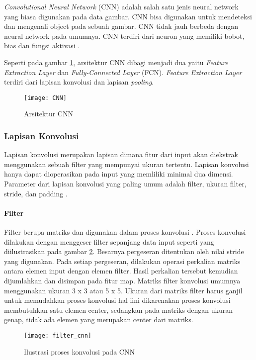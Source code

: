 \documentclass[../thesis.tex]{subfiles}
\begin{document}
\textit{Convolutional Neural Network} (CNN) adalah salah satu jenis neural network yang biasa digunakan pada data gambar. CNN bisa digunakan untuk mendeteksi dan mengenali object pada sebuah gambar.
CNN tidak jauh berbeda dengan neural network pada umumnya. CNN terdiri dari neuron yang memiliki bobot, bias dan fungsi aktivasi \cite{Wu2017IntroductionTC}.

Seperti pada gambar \ref{arsi_CNN}, arsitektur CNN dibagi menjadi dua yaitu \textit{Feature Extraction Layer} dan \textit{Fully-Connected Layer} (FCN). \textit{Feature Extraction Layer} terdiri dari lapisan konvolusi dan lapisan \textit{pooling}.
\begin{figure}[htp]
	\centering
	\texttt{[image: CNN]}
	\caption{Arsitektur CNN}
	\label{arsi_CNN}
\end{figure}

\subsubsection{Lapisan Konvolusi}
Lapisan konvolusi merupakan lapisan dimana fitur dari input akan diekstrak menggunakan sebuah filter yang mempunyai ukuran tertentu. Lapisan konvolusi hanya dapat
dioperasikan pada input yang memliliki minimal dua dimensi. Parameter dari lapisan konvolusi yang paling umum adalah filter, ukuran filter, stride, dan padding \cite{Wu2017IntroductionTC}.

\paragraph{Filter}

Filter berupa matriks dan digunakan dalam proses konvolusi \cite{Wu2017IntroductionTC}. Proses konvolusi dilakukan dengan menggeser filter sepanjang data input seperti yang diilustrasikan pada gambar \ref{konvolusi_CNN}. Besarnya pergeseran ditentukan oleh nilai stride yang digunakan. Pada setiap pergeseran, dilakukan operasi perkalian matriks antara elemen input dengan elemen filter. Hasil perkalian tersebut kemudian dijumlahkan dan 
disimpan pada fitur map. Matriks filter konvolusi umumnya menggunakan ukuran 3 x 3 atau 5 x 5. Ukuran dari matriks filter harus ganjil untuk memudahkan proses konvolusi hal iini dikarenakan proses konvolusi membutuhkan satu elemen center, sedangkan pada matriks dengan ukuran genap, tidak ada elemen yang merupakan center dari matriks.

\begin{figure}[htp]
	\centering
	\texttt{[image: filter\_cnn]}
	\caption{Ilustrasi proses konvolusi pada CNN}
	\label{konvolusi_CNN}
\end{figure}
\end{document}

